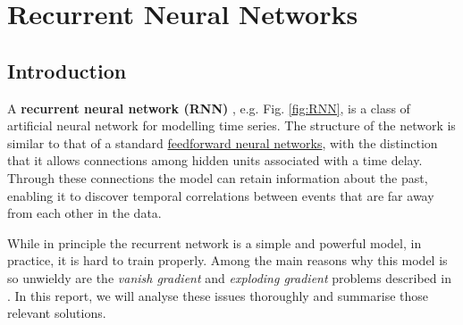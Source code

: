 \documentclass[a4paper, 12pt]{report}
\begin{document}
\chapter{Recurrent Neural Networks}

\section{Introduction}
A \textbf{recurrent neural network (RNN)} \cite{Rumelhart_1986}, e.g. Fig. \ref{fig:RNN}, is a class of artificial neural network for modelling time series.
The structure of the network is similar to that of a standard  \href{https://en.wikipedia.org/wiki/Feedforward_neural_network}{feedforward neural networks}, with the distinction that it allows connections among hidden units associated with a time delay.
Through these connections the model can retain information about the past, enabling it to discover temporal correlations between events that are far away from each other in the data.

While in principle the recurrent network is a simple and powerful model, in practice, it is hard to train properly. 
Among the main reasons why this model is so unwieldy are the \emph{vanish gradient} and \emph{exploding gradient} problems described in \cite{Bengio2002Learning}. 
In this report, we will analyse these issues thoroughly and summarise those relevant solutions.

\end{document}

